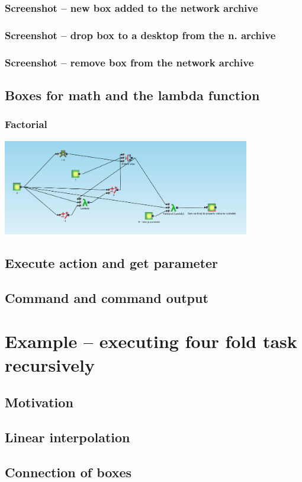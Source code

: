 \documentclass{beamer}
\begin{document}
\begin{frame}
	\frametitle{Screenshot -- new box added to the network archive}
\end{frame}

\begin{frame}
	\frametitle{Screenshot -- drop box to a desktop from the n. archive}
\end{frame}

\begin{frame}
	\frametitle{Screenshot -- remove box from the network archive}
\end{frame}


\subsection{Boxes for math and the lambda function}
\begin{frame}
	\frametitle{Factorial}
	\includegraphics[interpolate=true,width=10.8cm]{faktorial}
\end{frame}
\subsection{Execute action and get parameter}
\subsection{Command and command output}

\section{Example -- executing four fold task recursively}
\subsection{Motivation}
\subsection{Linear interpolation}
\subsection{Connection of boxes}
\end{document}
